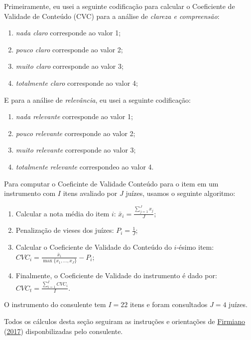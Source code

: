 \documentclass[
]{article}
\providecommand{\tightlist}{%
  \setlength{\itemsep}{0pt}\setlength{\parskip}{0pt}}
\begin{document}
Primeiramente, eu usei a seguinte codificação para calcular o Coeficiente de Validade de Conteúdo (CVC) para a análise de \emph{clareza e compreensão}:

\begin{enumerate}
\def\labelenumi{\arabic{enumi}.}
\tightlist
\item
  \emph{nada claro} corresponde ao valor 1;
\item
  \emph{pouco claro} corresponde ao valor 2;
\item
  \emph{muito claro} corresponde ao valor 3;
\item
  \emph{totalmente claro} corresponde ao valor 4;
\end{enumerate}

E para a análise de \emph{relevância}, eu usei a seguinte codificação:

\begin{enumerate}
\def\labelenumi{\arabic{enumi}.}
\tightlist
\item
  \emph{nada relevante} corresponde ao valor 1;
\item
  \emph{pouco relevante} corresponde ao valor 2;
\item
  \emph{muito relevante} corresponde ao valor 3;
\item
  \emph{totalmente relevante} correspondeo ao valor 4.
\end{enumerate}

Para computar o Coeficinte de Validade Conteúdo para o item em um instrumento com \(I\) itens avaliado por \(J\) juízes, usamos o seguinte algoritmo:

\begin{enumerate}
\def\labelenumi{\arabic{enumi}.}
\tightlist
\item
  Calcular a nota média do item \(i\): \(\bar{x}_i = \frac{\sum_{j=1}^{J}x_j}{J}\);
\item
  Penalização de vieses dos juízes: \(P_i = \frac{1}{J}\);
\item
  Calcular o Coeficiente de Validade do Conteúdo do \(i\)-ésimo item: \(CVC_i = \frac{\bar{x}_i}{\max{\{x_1, \dots, x_J\}}} - P_i\);
\item
  Finalmente, o Coeficiente de Validade do instrumento é dado por: \(CVC_t = \frac{\sum_{i=1}^{I}CVC_i}{I}\).
\end{enumerate}

O instrumento do consulente tem \(I = 22\) itens e foram consultados \(J = 4\) juízes.

Todos os cálculos desta seção seguiram as instruções e orientações de \protect\hyperlink{ref-firmiano2017escala}{Firmiano} (\protect\hyperlink{ref-firmiano2017escala}{2017}) disponbilizadas pelo consulente.
\end{document}
